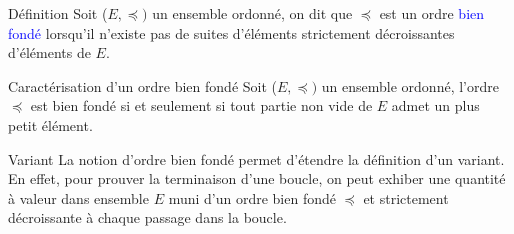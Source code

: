 \documentclass[10pt]{beamer}
\begin{document}

\begin{frame}[fragile]{\Ctitle}{\stitle}
    \begin{alertblock}{Définition}
        Soit ($E, \preccurlyeq)$ un ensemble ordonné, on dit que $\preccurlyeq$ est un ordre \textcolor{blue}{bien fondé} lorsqu'il n'existe pas de suites d'éléments strictement décroissantes d'éléments de $E$.
    \end{alertblock}
\end{frame}


\begin{frame}[fragile]{\Ctitle}{\stitle}
    \begin{alertblock}{Caractérisation d'un ordre bien fondé}
        Soit ($E, \preccurlyeq)$ un ensemble ordonné, l'ordre $\preccurlyeq$ est bien fondé si et seulement si tout partie non vide de $E$ admet un plus petit élément.
    \end{alertblock}
    \begin{block}{Variant}
        La notion d'ordre bien fondé permet d'étendre la définition d'un variant. En effet, pour prouver la terminaison d'une boucle, on peut exhiber une quantité à valeur dans ensemble $E$ muni d'un ordre bien fondé $\preccurlyeq$ et strictement décroissante à chaque passage dans la boucle.
    \end{block}
\end{frame}
\end{document}
